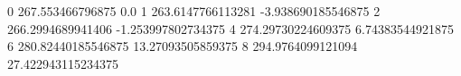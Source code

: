0 267.553466796875 0.0
1 263.6147766113281 -3.938690185546875
2 266.2994689941406 -1.253997802734375
4 274.29730224609375 6.74383544921875
6 280.82440185546875 13.27093505859375
8 294.9764099121094 27.422943115234375
